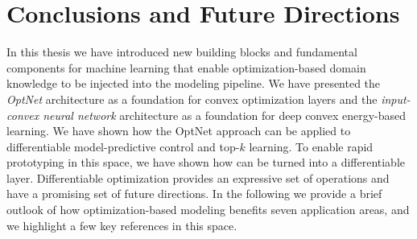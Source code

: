 \chapter{Conclusions and Future Directions}
\label{sec:conclusions}

In this thesis we have introduced new building blocks and
fundamental components for machine learning that enable
optimization-based domain knowledge to be injected
into the modeling pipeline.
We have presented the \emph{OptNet} architecture as a
foundation for convex optimization layers and the
\emph{input-convex neural network} architecture as a
foundation for deep convex energy-based learning.
We have shown how the OptNet approach can be applied to
differentiable model-predictive control and
top-$k$ learning.
To enable rapid prototyping in this space, we have shown
how \cvxpy can be turned into a differentiable layer.
Differentiable optimization provides an expressive set of
operations and have a promising set of future directions.
In the following we provide a brief outlook of how optimization-based
modeling benefits seven application areas,
and we highlight a few key references in this space.

